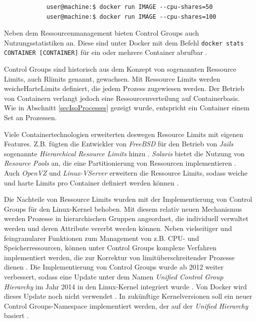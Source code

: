 \documentclass[../main.tex]{subfiles}
\begin{document}
		\begin{lstlisting}
			user@machine:$ docker run IMAGE --cpu-shares=50
			user@machine:$ docker run IMAGE --cpu-shares=100
		\end{lstlisting}

		Neben dem Ressourcenmanagement bieten Control Groups auch Nutzungsstatistiken an. Diese sind unter Docker mit dem Befehl \texttt{docker stats CONTAINER [CONTAINER]} für ein oder mehrere Container abrufbar \cite{dockerMetrics}.

		Control Groups sind historisch aus dem Konzept von sogenannten Ressource Limits, auch Rlimits genannt, gewachsen. Mit Ressource Limits werden \gls{weicheHarteLimits} definiert, die jedem Prozess zugewiesen werden. Der Betrieb von Containern verlangt jedoch eine Ressourcenverteilung auf Containerbasis. Wie in Abschnitt \ref{secIsoProcesses} gezeigt wurde, entspricht ein Container einem Set an Prozessen.


		Viele Containertechnologien erweiterten deswegen Resource Limits mit eigenen Features. Z.B. fügten die Entwickler von \emph{FreeBSD} für den Betrieb von \emph{Jails} sogenannte \emph{Hierarchical Resource Limits} hinzu \cite{freeBsdRCTL}. \emph{Solaris} bietet die Nutzung von \emph{Resource Pools} an, die eine Partitionierung von Ressourcen implementieren \cite{cgroupsUniHierarchyDoc}. Auch \emph{OpenVZ} und \emph{Linux-VServer} erweitern die Ressource Limits, sodass weiche und harte Limits pro Container definiert werden können \cite[S.15f.]{dockerSec2}.

		Die Nachteile von Ressource Limits wurden mit der Implementierung von Control Groups für den Linux-Kernel behoben. Mit diesem relativ neuen Mechanismus werden Prozesse in hierarchischen Gruppen angeordnet, die individuell verwaltet werden und deren Attribute vererbt werden können. Neben vielseitiger und feingranularer Funktionen zum Management von z.B. CPU- und Speicherressourcen, können unter Control Groups komplexe Verfahren implementiert werden, die zur Korrektur von limitüberschreitender Prozesse dienen \cite{cgroupsRedhat}. Die Implementierung von Control Groups wurde ab 2012 weiter verbessert, sodass eine Update unter dem Namen \emph{Unified Control Group Hierarchy} im Jahr 2014 in den Linux-Kernel integriert wurde \cite{cgroupsFixing}\cite{cgroupsUniHierarchy}. Von Docker wird dieses Update noch nicht verwendet \cite{githubCgroupsUniHierNotSupported}. In zukünftige Kernelversionen soll ein neuer Control Groups-Namespace implementiert werden, der auf der \emph{Unified Hierarchy} basiert \cite{cgroupNs}.
\end{document}
